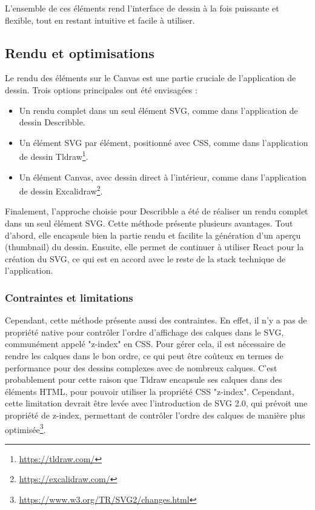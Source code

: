 L'ensemble de ces éléments rend l'interface de dessin à la fois puissante et flexible, tout en restant intuitive et facile à utiliser.

\subsection{Rendu et optimisations}

Le rendu des éléments sur le Canvas est une partie cruciale de l'application de dessin. Trois options principales ont été envisagées :

\begin{itemize}
    \item Un rendu complet dans un seul élément SVG, comme dans l'application de dessin Describble.
    \item Un élément SVG par élément, positionné avec CSS, comme dans l'application de dessin Tldraw\footnote{\url{https://tldraw.com/}}.
    \item Un élément Canvas, avec dessin direct à l'intérieur, comme dans l'application de dessin Excalidraw\footnote{\url{https://excalidraw.com/}}.
\end{itemize}

Finalement, l'approche choisie pour Describble a été de réaliser un rendu complet dans un seul élément SVG. Cette méthode présente plusieurs avantages. Tout d'abord, elle encapsule bien la partie rendu et facilite la génération d'un aperçu (thumbnail) du dessin. Ensuite, elle permet de continuer à utiliser React pour la création du SVG, ce qui est en accord avec le reste de la stack technique de l'application.

\subsubsection{Contraintes et limitations}

Cependant, cette méthode présente aussi des contraintes. En effet, il n'y a pas de propriété native pour contrôler l'ordre d'affichage des calques dans le SVG, communément appelé "z-index" en CSS. Pour gérer cela, il est nécessaire de rendre les calques dans le bon ordre, ce qui peut être coûteux en termes de performance pour des dessins complexes avec de nombreux calques. C'est probablement pour cette raison que Tldraw encapsule ses calques dans des éléments HTML, pour pouvoir utiliser la propriété CSS "z-index". Cependant, cette limitation devrait être levée avec l'introduction de SVG 2.0, qui prévoit une propriété de z-index, permettant de contrôler l'ordre des calques de manière plus optimisée\footnote{\url{https://www.w3.org/TR/SVG2/changes.html}}.

